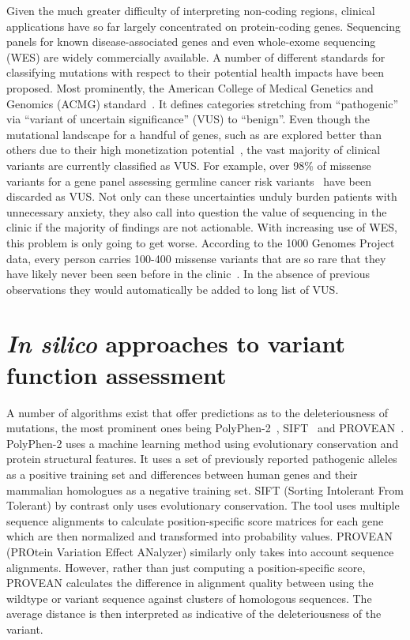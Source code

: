 Given the much greater difficulty of interpreting non-coding regions, clinical applications have so far largely concentrated on protein-coding genes. Sequencing panels for known disease-associated genes and even whole-exome sequencing (WES) are widely commercially available. A number of different standards for classifying mutations with respect to their potential health impacts have been proposed. Most prominently, the American College of Medical Genetics and Genomics (ACMG) standard~. It defines categories stretching from ``pathogenic'' via ``variant of uncertain significance'' (VUS) to ``benign''. Even though the mutational landscape for a handful of genes, such as  are explored better than others due to their high monetization potential~\cite{cheon_variants_2014}, the vast majority of clinical variants are currently classified as VUS. For example, over 98\% of missense variants for a gene panel assessing germline cancer risk variants~\cite{maxwell_evaluation_2016} have been discarded as VUS. Not only can these uncertainties unduly burden patients with unnecessary anxiety, they also call into question the value of sequencing in the clinic if the majority of findings are not actionable. With increasing use of WES, this problem is only going to get worse. According to  the 1000 Genomes Project data, every person carries 100-400 missense variants that are so rare that they have likely never been seen before in the clinic~\cite{the_1000_genomes_project_consortium_global_2015}. In the absence of previous observations they would automatically be added to long list of VUS.

\section{\textit{In silico} approaches to variant function assessment}
\label{insilicoIntro}

A number of algorithms exist that offer predictions as to the deleteriousness of mutations, the most prominent ones being PolyPhen-2~\cite{adzhubei_method_2010}, SIFT~\cite{SIFT} and PROVEAN~\cite{choi_fast_2012}. PolyPhen-2 uses a machine learning method using evolutionary conservation and protein structural features. It uses a set of previously reported pathogenic alleles as a positive training set and differences between human genes and their mammalian homologues as a negative training set. SIFT (Sorting Intolerant From Tolerant) by contrast only uses evolutionary conservation. The tool uses multiple sequence alignments to calculate position-specific score matrices for each gene which are then normalized and transformed into probability values. PROVEAN (PROtein Variation Effect ANalyzer) similarly only takes into account sequence alignments. However, rather than just computing a position-specific score, PROVEAN calculates the difference in alignment quality between using the wildtype or variant sequence against clusters of homologous sequences. The average distance is then interpreted as indicative of the deleteriousness of the variant. 

